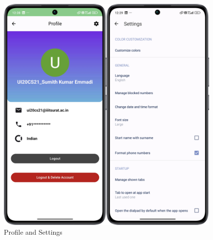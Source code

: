 \begin{figure}
    \centering
    \includegraphics[width=1\linewidth]{Media//whatsapp/profile}
    \caption{Profile and Settings}
    \label{fig:Profile and Settings}
\end{figure}


